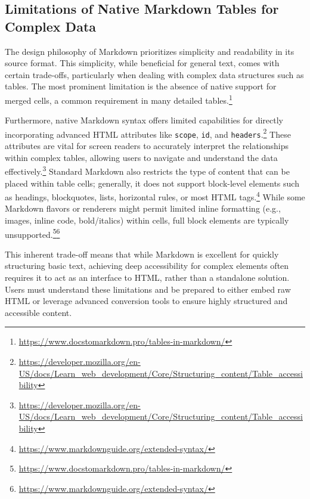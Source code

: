 \subsection{Limitations of Native Markdown Tables for Complex Data}
The design philosophy of Markdown prioritizes simplicity and readability in its source format. This simplicity, while beneficial for general text, comes with certain trade-offs, particularly when dealing with complex data structures such as tables. The most prominent limitation is the absence of native support for merged cells, a common requirement in many detailed tables.\footnote{\url{https://www.docstomarkdown.pro/tables-in-markdown/}}

Furthermore, native Markdown syntax offers limited capabilities for directly incorporating advanced HTML attributes like \texttt{scope}, \texttt{id}, and \texttt{headers}.\footnote{\url{https://developer.mozilla.org/en-US/docs/Learn_web_development/Core/Structuring_content/Table_accessibility}} These attributes are vital for screen readers to accurately interpret the relationships within complex tables, allowing users to navigate and understand the data effectively.\footnote{\url{https://developer.mozilla.org/en-US/docs/Learn_web_development/Core/Structuring_content/Table_accessibility}} Standard Markdown also restricts the type of content that can be placed within table cells; generally, it does not support block-level elements such as headings, blockquotes, lists, horizontal rules, or most HTML tags.\footnote{\url{https://www.markdownguide.org/extended-syntax/}} While some Markdown flavors or renderers might permit limited inline formatting (e.g., images, inline code, bold/italics) within cells, full block elements are typically unsupported.\footnote{\url{https://www.docstomarkdown.pro/tables-in-markdown/}}\footnote{\url{https://www.markdownguide.org/extended-syntax/}}

This inherent trade-off means that while Markdown is excellent for quickly structuring basic text, achieving deep accessibility for complex elements often requires it to act as an interface to HTML, rather than a standalone solution. Users must understand these limitations and be prepared to either embed raw HTML or leverage advanced conversion tools to ensure highly structured and accessible content.

